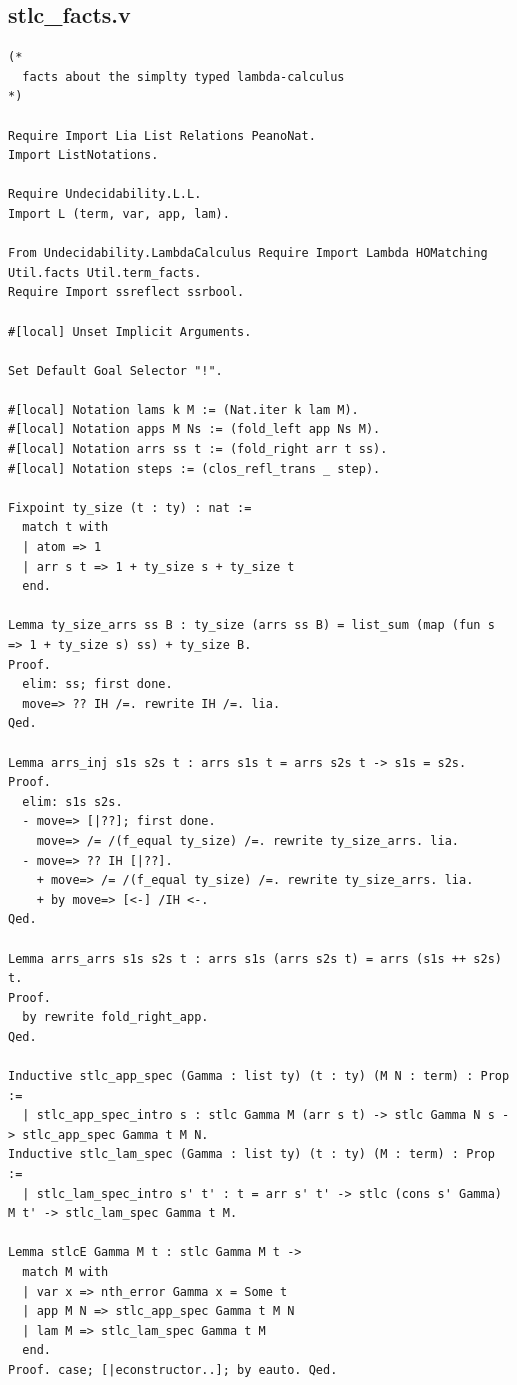 \documentclass[10pt,a4paper]{amsart}
\begin{document}
\subsection*{stlc\_facts.v}
\begin{lstlisting}
(*
  facts about the simplty typed lambda-calculus
*)

Require Import Lia List Relations PeanoNat.
Import ListNotations.

Require Undecidability.L.L.
Import L (term, var, app, lam).

From Undecidability.LambdaCalculus Require Import Lambda HOMatching Util.facts Util.term_facts.
Require Import ssreflect ssrbool.

#[local] Unset Implicit Arguments.

Set Default Goal Selector "!".

#[local] Notation lams k M := (Nat.iter k lam M).
#[local] Notation apps M Ns := (fold_left app Ns M).
#[local] Notation arrs ss t := (fold_right arr t ss).
#[local] Notation steps := (clos_refl_trans _ step).

Fixpoint ty_size (t : ty) : nat :=
  match t with
  | atom => 1
  | arr s t => 1 + ty_size s + ty_size t
  end.

Lemma ty_size_arrs ss B : ty_size (arrs ss B) = list_sum (map (fun s => 1 + ty_size s) ss) + ty_size B.
Proof.
  elim: ss; first done.
  move=> ?? IH /=. rewrite IH /=. lia.
Qed.

Lemma arrs_inj s1s s2s t : arrs s1s t = arrs s2s t -> s1s = s2s.
Proof.
  elim: s1s s2s.
  - move=> [|??]; first done.
    move=> /= /(f_equal ty_size) /=. rewrite ty_size_arrs. lia.
  - move=> ?? IH [|??].
    + move=> /= /(f_equal ty_size) /=. rewrite ty_size_arrs. lia.
    + by move=> [<-] /IH <-.
Qed.

Lemma arrs_arrs s1s s2s t : arrs s1s (arrs s2s t) = arrs (s1s ++ s2s) t.
Proof.
  by rewrite fold_right_app.
Qed.

Inductive stlc_app_spec (Gamma : list ty) (t : ty) (M N : term) : Prop :=
  | stlc_app_spec_intro s : stlc Gamma M (arr s t) -> stlc Gamma N s -> stlc_app_spec Gamma t M N.
Inductive stlc_lam_spec (Gamma : list ty) (t : ty) (M : term) : Prop :=
  | stlc_lam_spec_intro s' t' : t = arr s' t' -> stlc (cons s' Gamma) M t' -> stlc_lam_spec Gamma t M.

Lemma stlcE Gamma M t : stlc Gamma M t ->
  match M with
  | var x => nth_error Gamma x = Some t
  | app M N => stlc_app_spec Gamma t M N
  | lam M => stlc_lam_spec Gamma t M
  end.
Proof. case; [|econstructor..]; by eauto. Qed.


\end{lstlisting}
\end{document}

